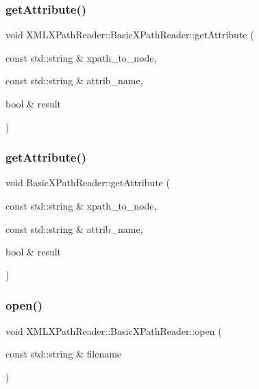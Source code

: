 \subsubsection{\texorpdfstring{getAttribute()}{getAttribute()}\hspace{0.1cm}{\footnotesize\ttfamily [29/30]}}
{\footnotesize\ttfamily void X\+M\+L\+X\+Path\+Reader\+::\+Basic\+X\+Path\+Reader\+::get\+Attribute (\begin{DoxyParamCaption}\item[{const std\+::string \&}]{xpath\+\_\+to\+\_\+node,  }\item[{const std\+::string \&}]{attrib\+\_\+name,  }\item[{bool \&}]{result }\end{DoxyParamCaption})}

\mbox{\label{classXMLXPathReader_1_1BasicXPathReader_a1683b972697031650a14b0bca5828338}} 
\subsubsection{\texorpdfstring{getAttribute()}{getAttribute()}\hspace{0.1cm}{\footnotesize\ttfamily [30/30]}}
{\footnotesize\ttfamily void Basic\+X\+Path\+Reader\+::get\+Attribute (\begin{DoxyParamCaption}\item[{const std\+::string \&}]{xpath\+\_\+to\+\_\+node,  }\item[{const std\+::string \&}]{attrib\+\_\+name,  }\item[{bool \&}]{result }\end{DoxyParamCaption})}

\mbox{\label{classXMLXPathReader_1_1BasicXPathReader_a0c3b7c392c0646fe682af255a0242a8c}} 
\subsubsection{\texorpdfstring{open()}{open()}\hspace{0.1cm}{\footnotesize\ttfamily [1/9]}}
{\footnotesize\ttfamily void X\+M\+L\+X\+Path\+Reader\+::\+Basic\+X\+Path\+Reader\+::open (\begin{DoxyParamCaption}\item[{const std\+::string \&}]{filename }\end{DoxyParamCaption})}

